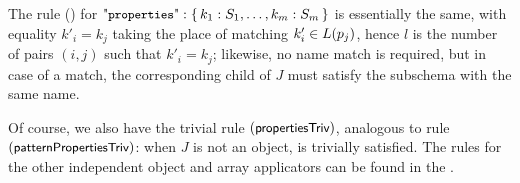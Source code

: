 


The rule (\rprops) for $\aprops: \JObj{ k_1 : S_1,\ldots,k_m : S_m }$ is essentially the same, with
equality $k'_i=k_j$ taking the place of matching $k'_i \in L(p_j)$, hence $l$ is the number of pairs $(i,j)$ such that $k'_i=k_j$; likewise, no name match is required, but in case of a match, the corresponding
child of $J$ must satisfy the subschema with the same name. 

Of course, we also have the trivial rule $(\mbox{\sf{\small properties}}\mbox{\sf{\small Triv}})$,  analogous to rule
$(\mbox{\sf{\small patternProperties}}\mbox{\sf{\small Triv}})$:  when $J$ is not an object, {\qprops} is trivially satisfied.
The rules for the other independent object %
and array applicators  %
can be found in the {\FV}.

